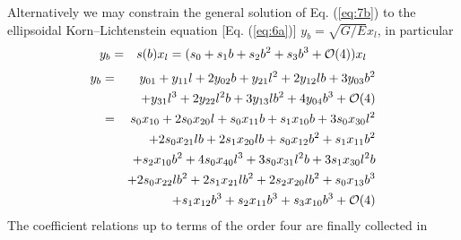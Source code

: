 \documentclass[jog]{svjour}
\begin{document}
\begin{corollary}
Alternatively we may constrain the general solution of Eq. (\ref{eq:7b})
to the ellipsoidal Korn--Lichtenstein equation [Eq. (\ref{eq:6a})]
$y_b=\sqrt{G/E}x_l$, in particular
\begin{eqnarray}
y_b &= &s(b)x_l=(s_0+s_1b+s_2b^2+s_3b^3+{\cal O}(4))x_l
\label{eq:24}
\end{eqnarray}
\begin{eqnarray}
\label{eq:25}
y_b &= &y_{01}+y_{11}l+2y_{02}b+y_{21}l^2+2y_{12}lb+3y_{03}b^2\\
& &+y_{31}l^3+2y_{22}l^2b+3y_{13}lb^2+4y_{04}b^3+{\cal O}(4)\nonumber\\
&= &s_0x_{10}+2s_0x_{20}l+s_0x_{11}b+s_1x_{10}b+3s_0x_{30}l^2\nonumber\\
& &+2s_0x_{21}lb+2s_1x_{20}lb+s_0x_{12}b^2+s_1x_{11}b^2\nonumber\\
& &+s_2x_{10}b^2+4s_0x_{40}l^3+3s_0x_{31}l^2b+3s_1x_{30}l^2b\nonumber\\
& &+2s_0x_{22}lb^2+2s_1x_{21}lb^2+2s_2x_{20}lb^2+s_0x_{13}b^3\nonumber\\
& &+s_1x_{12}b^3+s_2x_{11}b^3+s_3x_{10}b^3+{\cal O}(4)\nonumber
\end{eqnarray}
The coefficient relations up to terms of the order four are finally
collected in
\end{corollary}
\end{document}
